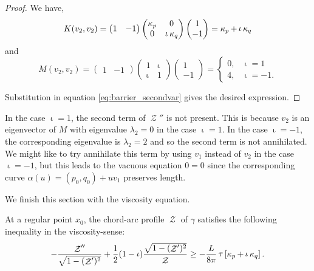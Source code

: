 \documentclass[11pt]{amsart}
\DeclareMathOperator{\chordarcprofile}{\mathcal{Z}}
\DeclareMathOperator{\tangindicator}{\iota}
\DeclareMathOperator{\norindicator}{\tau}
\begin{document}
\begin{proof}
We have,
\[
K(v_2, v_2) =
\begin{pmatrix}
1 & -1
\end{pmatrix}
\begin{pmatrix}
\curvecurv_{p} & 0 \\
0 & \tangindicator \curvecurv_{q}
\end{pmatrix}
\begin{pmatrix}
1 \\
-1
\end{pmatrix}
= \curvecurv_p + \tangindicator \curvecurv_q
\]
and
\[
M(v_2, v_2) = \begin{pmatrix}
1 & -1
\end{pmatrix}
\begin{pmatrix}
1 & \tangindicator \\
\tangindicator & 1
\end{pmatrix}
\begin{pmatrix}
1 \\
-1
\end{pmatrix}
= \begin{cases}
0, & \tangindicator = 1 \\
4, & \tangindicator = -1.
\end{cases}
\]

Substitution in equation \eqref{eq:barrier_secondvar} gives the desired expression.
\end{proof}

\begin{remark}
In the case \(\tangindicator = 1\), the second term of \(\chordarcprofile''\) is not present. This is because \(v_2\) is an eigenvector of \(M\) with eigenvalue \(\lambda_2 = 0\) in the case \(\tangindicator = 1\). In the case \(\tangindicator = -1\), the corresponding eigenvalue is \(\lambda_2 = 2\) and so the second term is not annihilated. We might like to try annihilate this term by using \(v_1\) instead of \(v_2\) in the case \(\tangindicator = -1\), but this leads to the vacuous equation \(0 = 0\) since the corresponding curve \(\alpha(u) = (p_0, q_0) + u v_1\) preserves length.
\end{remark}

We finish this section with the viscosity equation.

\begin{theorem}
\label{thm:spatial_viscosity}
At a regular point \(x_0\), the chord-arc profile $\chordarcprofile$ of \(\gamma\) satisfies the following inequality in the viscosity-sense:
\[
-\frac{\chordarcprofile''}{\sqrt{1-(\chordarcprofile')^2}} + \frac{1}{2} (1-\tangindicator) \frac{\sqrt{1 - (\chordarcprofile')^2}}{\chordarcprofile} \geq -\frac{L}{8\pi} \norindicator \left[\curvecurv_p + \tangindicator \curvecurv_q\right].
\]
\end{theorem}
\end{document}
